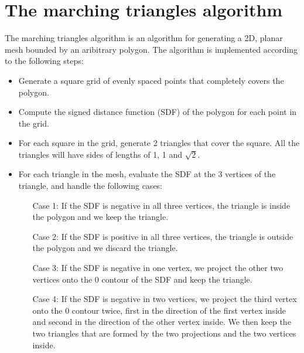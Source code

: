 \documentclass[acmtog]{acmart}
\begin{document}
\section{The marching triangles algorithm}
The marching triangles algorithm is an algorithm for generating a 2D, planar
mesh bounded by an aribitrary polygon. The algorithm is implemented according
to the following steps:
%
\begin{itemize}
  \item Generate a square grid of evenly spaced points that completely covers the
        polygon.
  \item Compute the signed distance function (SDF) of the polygon for each point in the
        grid.
  \item For each square in the grid, generate 2 triangles that cover the square. All
        the triangles will have sides of lengths of 1, 1 and $\sqrt{2}$.
  \item For each triangle in the mesh, evaluate the SDF at the 3 vertices of the
        triangle, and handle the following cases:
        \begin{itemize}
          \item[Case 1:] If the SDF is negative in all three vertices, the triangle is inside
                the polygon and we keep the triangle.
          \item[Case 2:] If the SDF is positive in all three vertices, the triangle is outside
                the polygon and we discard the triangle.
          \item[Case 3:] If the SDF is negative in one vertex, we project the other two
                vertices onto the 0 contour of the SDF and keep the triangle.
          \item[Case 4:] If the SDF is negative in two vertices, we project the third vertex
                onto the 0 contour twice, first in the direction of the first vertex inside and
                second in the direction of the other vertex inside. We then keep the two
                triangles that are formed by the two projections and the two vertices inside.
        \end{itemize}
\end{itemize}
\end{document}
